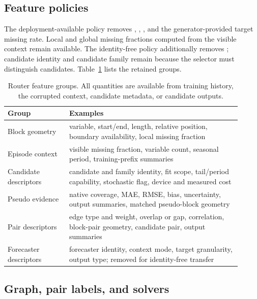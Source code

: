 \subsection{Feature policies}

The deployment-available policy removes , , , and the generator-provided target missing rate. Local and global missing fractions computed from the visible context remain available. The identity-free policy additionally removes ; candidate identity and candidate family remain because the selector must distinguish candidates. Table~\ref{tab:feature-groups-r2} lists the retained groups.

\begin{table}[h]
\caption{Router feature groups. All quantities are available from training history, the corrupted context, candidate metadata, or candidate outputs.}
\label{tab:feature-groups-r2}
\centering
\small
\begin{tabular}{p{0.24\linewidth}p{0.67\linewidth}}
\toprule
Group & Examples \\
\midrule
Block geometry & variable, start/end, length, relative position, boundary availability, local missing fraction \\
Episode context & visible missing fraction, variable count, seasonal period, training-prefix summaries \\
Candidate descriptors & candidate and family identity, fit scope, tail/period capability, stochastic flag, device and measured cost \\
Pseudo evidence & native coverage, MAE, RMSE, bias, uncertainty, output summaries, matched pseudo-block geometry \\
Pair descriptors & edge type and weight, overlap or gap, correlation, block-pair geometry, candidate pair, output summaries \\
Forecaster descriptors & forecaster identity, context mode, target granularity, output type; removed for identity-free transfer \\
\bottomrule
\end{tabular}
\end{table}

\subsection{Graph, pair labels, and solvers}

